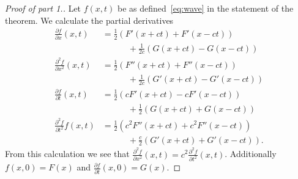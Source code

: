 \begin{proof}[Proof of part 1.]
    Let \(f(x,t)\) be as defined~\eqref{eq:wave} in the statement of the theorem.
    We calculate the partial derivatives
    \[
        \begin{aligned}
            \tfrac{\partial f}{\partial x} (x,t)
             & = \tfrac{1}{2} \left(F'(x+ct) + F'(x-ct)\right)          \\
             & \quad\quad\quad
            + \tfrac{1}{2c}\left(G(x+ct) - G(x-ct)\right)               \\
            \tfrac{\partial^2 f}{\partial x^2}(x,t)
             & = \tfrac{1}{2} \left(F''(x+ct) + F''(x-ct)\right)        \\
             & \quad\quad\quad
            + \tfrac{1}{2c}\left(G'(x+ct) - G'(x-ct)\right)             \\
            \tfrac{\partial f}{\partial t} (x,t)
             & = \tfrac{1}{2} \left(cF'(x+ct) - c F'(x-ct)\right)       \\
             & \quad\quad\quad
            + \tfrac{1}{2}\left(G(x+ct) + G(x-ct)\right)                \\
            \tfrac{\partial^2 f}{\partial t^2} f(x,t)
             & = \tfrac{1}{2} \left(c^2F''(x+ct) + c^2 F''(x-ct)\right) \\
             & \quad\quad\quad
            + \tfrac{c}{2}\left(G'(x+ct) + G'(x-ct)\right).
        \end{aligned}
    \]
    From this calculation we see that  \(   \frac{\partial^2 f}{\partial x^2}(x,t) = c^2  \frac{\partial^2 f}{\partial t^2}(x,t) \).
    Additionally \(f(x,0) = F(x)\)
    and \(\frac{\partial f}{\partial t}(x,0) = G(x)\).
\end{proof}


